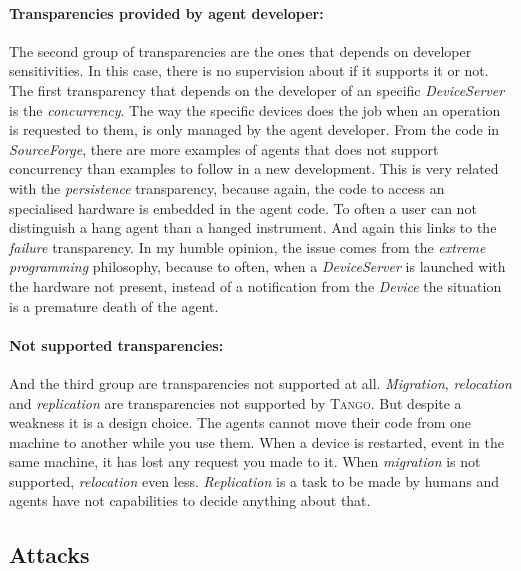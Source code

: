 \documentclass[10pt,a4paper,twoside]{llncs}
\newcommand{\ok}[1]{``#1'' [\texttt{\color{green}OK}]}
\newcommand{\tango}{\textsc{Tango}}
\begin{document}
\paragraph{Transparencies provided by agent developer:} The second group of transparencies are the ones that depends on developer sensitivities. In this case, there is no supervision about if it supports it or not. The first transparency that depends on the developer of an specific \emph{DeviceServer} is the \emph{concurrency}. The way the specific devices does the job when an operation is requested to them, is only managed by the agent developer. From the code in \emph{SourceForge}, there are more examples of agents that does not support concurrency than examples to follow in a new development. This is very related with the \emph{persistence} transparency, because again, the code to access an specialised hardware is embedded in the agent code. To often a user can not distinguish a hang agent than a hanged instrument. And again this links to the \emph{failure} transparency. In my humble opinion, the issue comes from the \emph{extreme programming} philosophy, because to often, when a \emph{DeviceServer} is 
launched with the hardware not present, instead of a notification from the \emph{Device} the situation is a premature death of the agent.

\paragraph{Not supported transparencies:} And the third group are transparencies not supported at all. \emph{Migration}, \emph{relocation} and \emph{replication} are transparencies not supported by \tango. But despite a weakness it is a design choice. The agents cannot move their code from one machine to another while you use them. When a device is restarted, event in the same machine, it has lost any request you made to it. When \emph{migration} is not supported, \emph{relocation} even less. \emph{Replication} is a task to be made by humans and agents have not capabilities to decide anything about that.

\subsection{Attacks}

\end{document}
